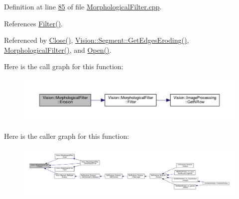 Definition at line \hyperlink{_morphological_filter_8cpp_source_l00085}{85} of file \hyperlink{_morphological_filter_8cpp_source}{Morphological\+Filter.\+cpp}.



References \hyperlink{_morphological_filter_8cpp_source_l00089}{Filter()}.



Referenced by \hyperlink{_morphological_filter_8cpp_source_l00076}{Close()}, \hyperlink{_segment_8cpp_source_l00483}{Vision\+::\+Segment\+::\+Get\+Edges\+Eroding()}, \hyperlink{_morphological_filter_8cpp_source_l00013}{Morphological\+Filter()}, and \hyperlink{_morphological_filter_8cpp_source_l00071}{Open()}.



Here is the call graph for this function\+:
\nopagebreak
\begin{figure}[H]
\begin{center}
\leavevmode
\includegraphics[width=350pt]{class_vision_1_1_morphological_filter_a62ad82519dc19be6367193a5d539c98b_cgraph}
\end{center}
\end{figure}




Here is the caller graph for this function\+:
\nopagebreak
\begin{figure}[H]
\begin{center}
\leavevmode
\includegraphics[width=350pt]{class_vision_1_1_morphological_filter_a62ad82519dc19be6367193a5d539c98b_icgraph}
\end{center}
\end{figure}


\hypertarget{class_vision_1_1_morphological_filter_ab743062372a8d0b26dabfd27451e72ed}{}
